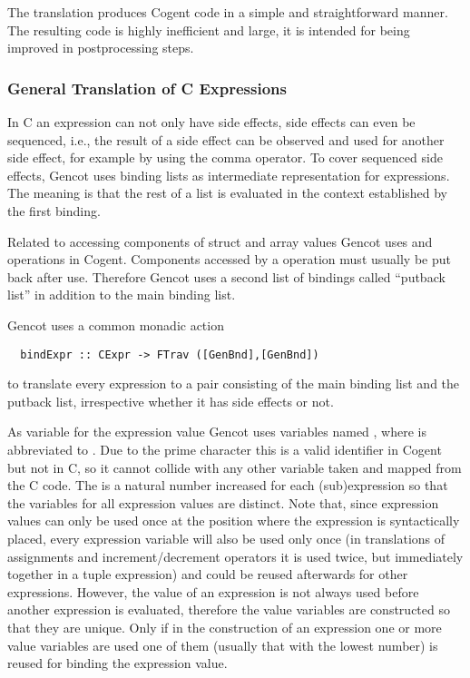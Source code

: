 The translation produces Cogent code in a simple and straightforward manner. The resulting code is highly inefficient
and large, it is intended for being improved in postprocessing steps.

\subsubsection{General Translation of C Expressions}

In C an expression can not only have side effects, side effects can even be sequenced, i.e., the result of a side
effect can be observed and used for another side effect, for example by using the comma operator. To cover sequenced 
side effects, Gencot uses binding lists as intermediate representation for expressions. The meaning is that the 
rest of a list is evaluated in the context established by the first binding. 

Related to accessing components of struct and array values Gencot uses  and  operations in Cogent.
Components accessed by a  operation must usually be put back after use. Therefore Gencot uses a second
list of bindings called ``putback list'' in addition to the main binding list. 

Gencot uses a common monadic action 
\begin{verbatim}
  bindExpr :: CExpr -> FTrav ([GenBnd],[GenBnd])
\end{verbatim}
to translate every expression to a pair consisting of the main binding list and the putback list, irrespective whether 
it has side effects or not.

As variable for the expression value Gencot uses variables named , where  is abbreviated to 
. Due to the prime character this is
a valid identifier in Cogent but not in C, so it cannot collide with any other variable taken and mapped from the C
code. The  is a natural number increased for each (sub)expression so that the variables for all expression 
values are distinct. Note that, since expression values can only be used once at the position where the expression 
is syntactically placed, every expression variable will also be used only once (in translations of assignments and
increment/decrement operators it is used twice, but immediately together in a tuple expression) and could be reused afterwards for 
other expressions. However, the value of an expression is not always used before another expression is evaluated,
therefore the value variables are constructed so that they are unique. Only if in the construction of an expression
one or more value variables are used one of them (usually that with the lowest number) is reused for binding the expression value.

